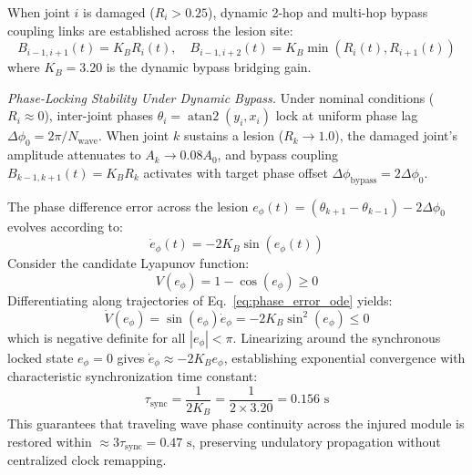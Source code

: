 \documentclass{iopjournal}
\begin{document}
When joint $i$ is damaged ($R_i > 0.25$), dynamic 2-hop and multi-hop bypass coupling links are established across the lesion site:
\begin{equation}
B_{i-1,i+1}(t) = K_B R_i(t), \quad B_{i-1,i+2}(t) = K_B \min(R_i(t), R_{i+1}(t))
\label{eq:bypass_coupling}
\end{equation}
where $K_B = 3.20$ is the dynamic bypass bridging gain.

\vspace{0.3em}
\noindent\textit{Phase-Locking Stability Under Dynamic Bypass.} Under nominal conditions ($R_i \approx 0$), inter-joint phases $\theta_i = \operatorname{atan2}(y_i, x_i)$ lock at uniform phase lag $\Delta\phi_0 = 2\pi / N_{\text{wave}}$. When joint $k$ sustains a lesion ($R_k \to 1.0$), the damaged joint's amplitude attenuates to $A_k \to 0.08 A_0$, and bypass coupling $B_{k-1, k+1}(t) = K_B R_k$ activates with target phase offset $\Delta\phi_{\text{bypass}} = 2\Delta\phi_0$.

The phase difference error across the lesion $e_\phi(t) = (\theta_{k+1} - \theta_{k-1}) - 2\Delta\phi_0$ evolves according to:
\begin{equation}
\dot{e}_\phi(t) = -2 K_B \sin(e_\phi(t))
\label{eq:phase_error_ode}
\end{equation}
Consider the candidate Lyapunov function:
\begin{equation}
V(e_\phi) = 1 - \cos(e_\phi) \ge 0
\end{equation}
Differentiating along trajectories of Eq.~\ref{eq:phase_error_ode} yields:
\begin{equation}
\dot{V}(e_\phi) = \sin(e_\phi) \dot{e}_\phi = -2 K_B \sin^2(e_\phi) \le 0
\end{equation}
which is negative definite for all $|e_\phi| < \pi$. Linearizing around the synchronous locked state $e_\phi = 0$ gives $\dot{e}_\phi \approx -2 K_B e_\phi$, establishing exponential convergence with characteristic synchronization time constant:
\begin{equation}
\tau_{\text{sync}} = \frac{1}{2 K_B} = \frac{1}{2 \times 3.20} = 0.156\text{ s}
\end{equation}
This guarantees that traveling wave phase continuity across the injured module is restored within $\approx 3 \tau_{\text{sync}} = 0.47\text{ s}$, preserving undulatory propagation without centralized clock remapping.
\end{document}
